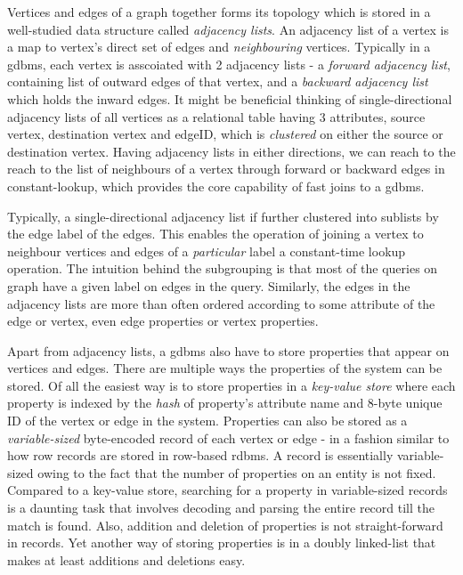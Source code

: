 Vertices and edges of a graph together forms its topology which is stored in a well-studied data structure called \emph{adjacency lists}. An adjacency list of a vertex is a map to vertex's direct set of edges and \emph{neighbouring} vertices. Typically in a \gls{gdbms}, each vertex is asscoiated with 2 adjacency lists - a \emph{forward adjacency list}, containing list of outward edges of that vertex, and a \emph{backward adjacency list} which holds the inward edges. It might be beneficial thinking of single-directional adjacency lists of all vertices as a relational table having 3 attributes, source vertex, destination vertex and edgeID, which is \emph{clustered} on either the source or destination vertex. Having adjacency lists in either directions, we can reach to the reach to the list of neighbours of a vertex through forward or backward edges in constant-lookup, which provides the core capability of fast joins to a \gls{gdbms}. 

Typically, a single-directional adjacency list if further clustered into sublists by the edge label of the edges. This enables the operation of joining a vertex to neighbour vertices and edges of a \emph{particular} label a constant-time lookup operation. The intuition behind the subgrouping is that most of the queries on graph have a given label on edges in the query. Similarly, the edges in the adjacency lists are more than often ordered according to some attribute of the edge or vertex, even edge properties or vertex properties.

Apart from adjacency lists, a \gls{gdbms} also have to store properties that appear on vertices and edges. There are multiple ways the properties of the system can be stored. Of all the easiest way is to store properties in a \emph{key-value store} where each property is indexed by the \emph{hash} of property's attribute name and 8-byte unique ID of the vertex or edge in the system. Properties can also be stored as a \emph{variable-sized} byte-encoded record of each vertex or edge - in a fashion similar to how row records are stored in row-based \gls{rdbms}. A record is essentially variable-sized owing to the fact that the number of properties on an entity is not fixed. Compared to a key-value store, searching for a property in variable-sized records is a daunting task that involves decoding and parsing the entire record till the match is found. Also, addition and deletion of properties is not straight-forward in records. Yet another way of storing properties is in a doubly linked-list that makes at least additions and deletions easy.

